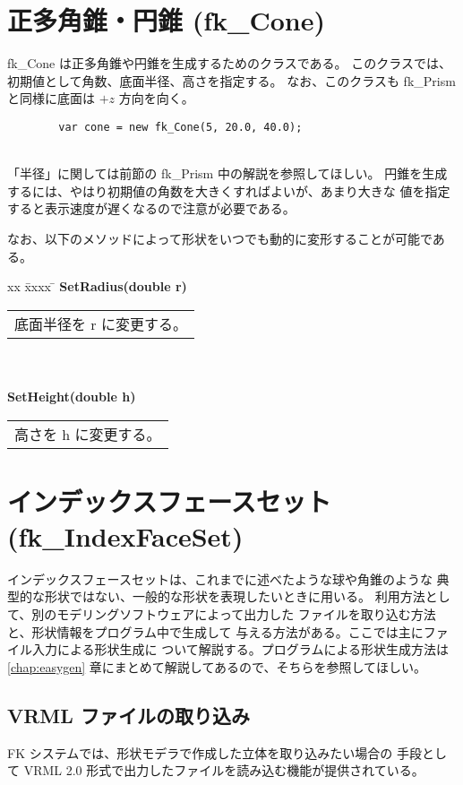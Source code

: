 \section{正多角錐・円錐 (fk\_Cone)}
fk\_Cone は正多角錐や円錐を生成するためのクラスである。
このクラスでは、初期値として角数、底面半径、高さを指定する。
なお、このクラスも fk\_Prism と同様に底面は \(+z\) 方向を向く。
\\
\begin{screen}
\begin{verbatim}
        var cone = new fk_Cone(5, 20.0, 40.0);
\end{verbatim}
\end{screen}
~ \\
「半径」に関しては前節の fk\_Prism 中の解説を参照してほしい。
円錐を生成するには、やはり初期値の角数を大きくすればよいが、あまり大きな
値を指定すると表示速度が遅くなるので注意が必要である。

なお、以下のメソッドによって形状をいつでも動的に変形することが可能である。

\begin{tabbing}
xx \= xxxx \= \kill
\> \textbf{SetRadius(double r)} \\
	\> \> \begin{tabular}{p{15cm}}
		底面半径を r に変更する。
	\end{tabular} \\ \\

\> \textbf{SetHeight(double h)} \\
	\> \> \begin{tabular}{p{15cm}}
		高さを h に変更する。
	\end{tabular}
\end{tabbing}

\section{インデックスフェースセット (fk\_IndexFaceSet)}
インデックスフェースセットは、これまでに述べたような球や角錐のような
典型的な形状ではない、一般的な形状を表現したいときに用いる。
利用方法として、別のモデリングソフトウェアによって出力した
ファイルを取り込む方法と、形状情報をプログラム中で生成して
与える方法がある。ここでは主にファイル入力による形状生成に
ついて解説する。プログラムによる形状生成方法は
\ref{chap:easygen} 章にまとめて解説してあるので、そちらを参照してほしい。

\subsection{VRML ファイルの取り込み}
FK システムでは、形状モデラで作成した立体を取り込みたい場合の
手段として VRML 2.0 形式で出力したファイルを読み込む機能が提供されている。


